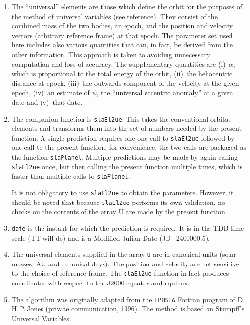 \documentclass[11pt,fleqn,twoside]{article}
\renewcommand{\_}{{\tt\char'137}}     %
\begin{document}
{
 \begin{enumerate}
  \setlength{\parskip}{\medskipamount}
  \item The ``universal'' elements are those which define the orbit for the
        purposes of the method of universal variables (see reference).
        They consist of the combined mass of the two bodies, an epoch,
        and the position and velocity vectors (arbitrary reference frame)
        at that epoch.  The parameter set used here includes also various
        quantities that can, in fact, be derived from the other
        information.  This approach is taken to avoiding unnecessary
        computation and loss of accuracy.  The supplementary quantities
        are (i)~$\alpha$, which is proportional to the total energy of the
        orbit, (ii)~the heliocentric distance at epoch,
        (iii)~the outwards component of the velocity at the given epoch,
        (iv)~an estimate of $\psi$, the ``universal eccentric anomaly'' at a
        given date and (v)~that date.
  \item The companion function is {\tt slaEl2ue}.  This takes the conventional
        orbital elements and transforms them into the set of numbers
        needed by the present function.  A single prediction requires one
        one call to {\tt slaEl2ue} followed by one call to the present function;
        for convenience, the two calls are packaged as the function
        {\tt slaPlanel}.  Multiple predictions may be made by again
        calling {\tt slaEl2ue} once, but then calling the present function
        multiple times, which is faster than multiple calls to {\tt slaPlanel}.
 
        It is not obligatory to use {\tt slaEl2ue} to obtain the parameters.
        However, it should be noted that because {\tt slaEl2ue} performs its
        own validation, no checks on the contents of the array U are made
        by the present function.
  \item {\tt date} is the instant for which the
        prediction is required.  It is
        in the TDB time-scale (TT will do) and is a
        Modified Julian Date (JD$-$2400000.5).
  \item The universal elements supplied in the array
        {\tt u} are in canonical
        units (solar masses, AU and canonical days).  The position and
        velocity are not sensitive to the choice of reference frame.  The
        {\tt slaEl2ue} function in fact produces coordinates with respect to the
        J2000 equator and equinox.
  \item The algorithm was originally adapted from the
        {\tt EPHSLA} Fortran program of
        D.\,H.\,P.\,Jones (private communication, 1996).  The method
        is based on Stumpff's Universal Variables.
 \end{enumerate}
}
\end{document}

